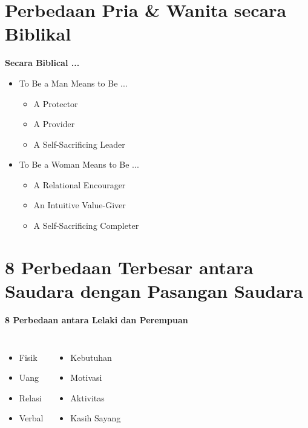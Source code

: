 \documentclass{beamer}
\theoremstyle{mystyle}
\begin{document}
\section{Perbedaan Pria \& Wanita secara Biblikal}
\begin{frame}{\textbf{Secara Biblical ...}}
	\begin{itemize}
		\item<2-> To Be a Man Means to Be ...
		\begin{itemize}
			\item<2-> A Protector 
			\item<2-> A Provider
			\item<2-> A Self-Sacrificing Leader
		\end{itemize}
		
		\bigskip		
		
		\item<3-> To Be a Woman Means to Be ...
		\begin{itemize}
			\item<3-> A Relational Encourager
			\item<3-> An Intuitive Value-Giver
			\item<3-> A Self-Sacrificing Completer
		\end{itemize}
	\end{itemize}

\end{frame}



\section{8 Perbedaan Terbesar antara Saudara dengan Pasangan Saudara}
\begin{frame}{\textbf{8 Perbedaan antara Lelaki dan Perempuan}}
	\begin{columns}[c]		
		\column{1.5in}
		\begin{itemize}
			\item<2-> Fisik
			\hfill \break
			\item<3-> Uang
			\hfill \break
			\item<4-> Relasi
			\hfill \break
			\item<5-> Verbal
		\end{itemize}		
		\column{2.5in}
		\begin{itemize}
			\item<6-> Kebutuhan 
			\hfill \break
			\item<7-> Motivasi
			\hfill \break
			\item<8-> Aktivitas
			\hfill \break
			\item<9-> Kasih Sayang
		\end{itemize}				
	\end{columns}
\end{frame}
\end{document}
